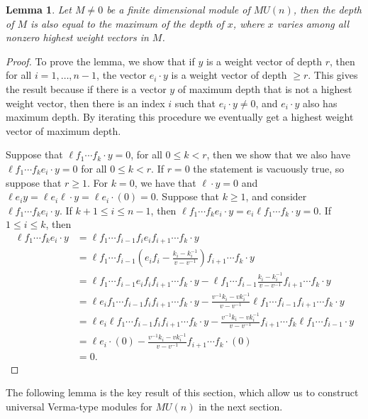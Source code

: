 \documentclass{amsart}
\numberwithin{equation}{section}
\theoremstyle{theorem}
\newtheorem{lemma}[theorem]{Lemma}
\theoremstyle{definition}
\begin{document}
\begin{lemma}\label{lem:highest-depth} Let $M\neq 0$ be a finite dimensional module of $MU(n)$, then the depth of $M$ is also equal to the maximum of the depth of $x$, where $x$ varies among all nonzero highest weight vectors in $M$. 
\end{lemma}
\begin{proof}
To prove the lemma, we show that if $y$ is a weight vector of depth $r$, then for all $i=1,\ldots,n-1$, the vector $e_i\cdot y$ is a weight vector of depth $\geq r$. This gives the result because if there is a vector $y$ of maximum depth that is not a highest weight vector, then there is an index $i$ such that $e_i\cdot y\neq 0$, and $e_i\cdot y$ also has maximum depth. By iterating this procedure we eventually get a highest weight vector of maximum depth.

Suppose that $\ell f_1\cdots f_k \cdot y=0$, for all $0\leq k<r$, then we show that we also have $\ell f_1\cdots f_k e_i\cdot y=0$ for all $0\leq k<r$.
If $r=0$ the statement is vacuously true, so suppose that $r\geq 1$. For $k=0$, we have that $\ell\cdot y=0$ and $\ell e_iy=\ell e_i\ell\cdot y=\ell e_i\cdot(0)=0$.
Suppose that $k\geq 1$, and consider $\ell f_1\cdots f_k e_i\cdot y$. If $k+1\leq i\leq n-1$, then $\ell f_1\cdots f_k e_i\cdot y=e_i \ell f_1\cdots f_k\cdot y=0$. If $1\leq i\leq k$, then
\begin{align*}
\ell f_1\cdots f_k e_i\cdot y &= \ell f_1\cdots f_{i-1} f_i e_i f_{i+1}\cdots f_k\cdot y \\
&=  \ell f_1\cdots f_{i-1}\left( e_if_i -\frac{k_i-k_i^{-1}}{v-v^{-1}}\right)f_{i+1}\cdots f_k\cdot y \\
&=  \ell f_1\cdots f_{i-1}e_if_if_{i+1}\cdots f_k\cdot y -\ell f_1\cdots f_{i-1}\frac{k_i-k_i^{-1}}{v-v^{-1}}f_{i+1}\cdots f_k\cdot  y \\
&= \ell e_if_1\cdots f_{i-1}f_if_{i+1}\cdots f_k \cdot y - \frac{v^{-1}k_i-vk_i^{-1}}{v-v^{-1}}\ell f_1\cdots f_{i-1}f_{i+1}\cdots f_k\cdot y \\
&= \ell e_i\ell f_1\cdots f_{i-1}f_if_{i+1}\cdots f_k\cdot y - \frac{v^{-1}k_i-vk_i^{-1}}{v-v^{-1}}f_{i+1}\cdots f_k\ell f_1\cdots f_{i-1} \cdot y \\
&= \ell e_i\cdot(0) - \frac{v^{-1}k_i-vk_i^{-1}}{v-v^{-1}}f_{i+1}\cdots f_k\cdot (0) \\
&= 0.
\end{align*}
\end{proof}

The following lemma is the key result of this section, which allow us to construct universal Verma-type modules for $MU(n)$ in the next section.
\end{document}
